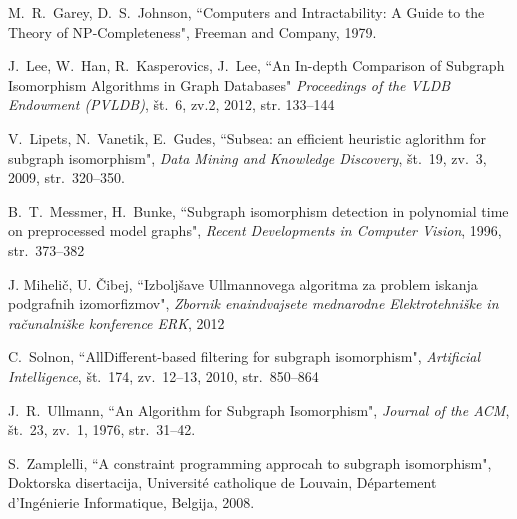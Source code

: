 \documentclass[a4paper, 12pt, ]{book}
\begin{document}
\begin{thebibliography}{99}
	 M.~R.~Garey, D.~S.~Johnson, ``Computers and Intractability: A Guide to the Theory of NP-Completeness",
		Freeman and Company, 1979.
	
	J.~Lee, W.~Han, R.~Kasperovics, J.~Lee, ``An In-depth Comparison of Subgraph Isomorphism Algorithms in Graph Databases"
		\textit{Proceedings of the VLDB Endowment (PVLDB)}, št.~6, zv.2, 2012, str. 133--144
	
	 V.~Lipets, N.~Vanetik, E.~Gudes, ``Subsea: an efficient heuristic aglorithm for subgraph isomorphism",
		\textit{Data Mining and Knowledge Discovery}, št.~19, zv.~3, 2009, str.~320--350.

	 B.~T.~Messmer, H.~Bunke, ``Subgraph isomorphism detection in polynomial time on preprocessed model graphs",
		\textit{Recent Developments in Computer Vision}, 1996, str.~373--382

	 J. Mihelič, U. Čibej, ``Izboljšave Ullmannovega algoritma za problem iskanja podgrafnih izomorfizmov",
		\textit{Zbornik enaindvajsete mednarodne Elektrotehniške in računalniške konference ERK}, 2012

	 C.~Solnon, ``AllDifferent-based filtering for subgraph isomorphism",
		\textit{Artificial Intelligence}, št.~174, zv.~12--13, 2010, str.~850--864

	 J.~R.~Ullmann, ``An Algorithm for Subgraph Isomorphism",
		\textit{Journal of the ACM}, št.~23, zv.~1, 1976, str.~31--42.

	 S.~Zamplelli, ``A constraint programming approcah to subgraph isomorphism", Doktorska disertacija, 
	Universit\'{e} catholique de Louvain, D\'{e}partement d’Ing\'{e}nierie Informatique, Belgija, 2008.
	

\end{thebibliography}
\end{document}
